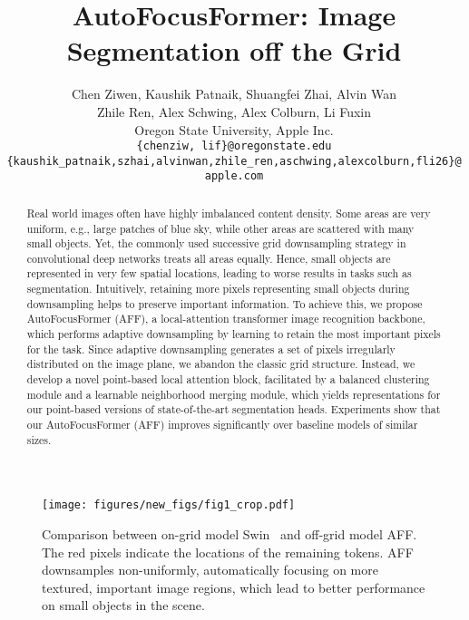 \documentclass[10pt,twocolumn,letterpaper]{article}
\begin{document}
\title{AutoFocusFormer: Image Segmentation off the Grid}

\author{
Chen Ziwen, 
Kaushik Patnaik,
Shuangfei Zhai,
Alvin Wan \\
Zhile Ren,
Alex Schwing,
Alex Colburn, 
Li Fuxin \\
Oregon State University, Apple Inc. \\
{\tt \small \{chenziw, lif\}@oregonstate.edu}\\
{\tt \small \{kaushik\_patnaik,szhai,alvinwan,zhile\_ren,aschwing,alexcolburn,fli26\}@apple.com}
}
\maketitle


\begin{abstract}
   Real world images often have highly imbalanced content density. Some areas are very uniform, e.g., large patches of blue sky, while other areas are scattered with many small objects. Yet, the commonly used successive grid downsampling strategy in convolutional deep networks treats all areas equally. Hence, small objects are represented in very few spatial locations, leading to worse results in tasks such as segmentation. 
   Intuitively, retaining more pixels representing small objects during downsampling helps to preserve important information. 
   To achieve this, we propose AutoFocusFormer (AFF), a local-attention transformer image recognition backbone, which performs adaptive downsampling by learning to retain the most important pixels for the task.
   Since adaptive downsampling generates a set of pixels irregularly distributed on the image plane, we abandon the classic grid structure.
   Instead, we develop a novel point-based local attention block, facilitated by a balanced clustering module and a learnable neighborhood merging module, which yields representations for
   our point-based versions of state-of-the-art segmentation heads. 
   Experiments show that our AutoFocusFormer (AFF) improves significantly over baseline models of similar sizes.




\end{abstract}





\begin{figure}
    \centering
    \texttt{[image: figures/new\_figs/fig1\_crop.pdf]}
    \vskip -0.1in
    \caption{Comparison between on-grid model Swin~\cite{swin} and off-grid model AFF. The red pixels indicate the locations of the remaining tokens. AFF downsamples non-uniformly, automatically focusing on more textured, important image regions, which lead to better performance on small objects in the scene. }
    \label{fig:city_first}
    \vskip -0.15in
\end{figure}
\end{document}
